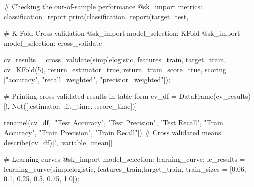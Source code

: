 \documentclass[
  letterpaper,
]{book}
\newenvironment{Shaded}{\begin{snugshade}}{\end{snugshade}}
\newcommand{\CommentTok}[1]{\textcolor[rgb]{0.37,0.37,0.37}{#1}}
\newcommand{\ConstantTok}[1]{\textcolor[rgb]{0.56,0.35,0.01}{#1}}
\newcommand{\FloatTok}[1]{\textcolor[rgb]{0.68,0.00,0.00}{#1}}
\newcommand{\FunctionTok}[1]{\textcolor[rgb]{0.28,0.35,0.67}{#1}}
\newcommand{\NormalTok}[1]{\textcolor[rgb]{0.00,0.23,0.31}{#1}}
\newcommand{\OperatorTok}[1]{\textcolor[rgb]{0.37,0.37,0.37}{#1}}
\newcommand{\PreprocessorTok}[1]{\textcolor[rgb]{0.68,0.00,0.00}{#1}}
\newcommand{\StringTok}[1]{\textcolor[rgb]{0.13,0.47,0.30}{#1}}
\begin{document}
\begin{Shaded}
\begin{Highlighting}[]
\CommentTok{\# Checking the out{-}of{-}sample performance}
\PreprocessorTok{@sk\_import}\NormalTok{ metrics}\OperatorTok{:}\NormalTok{ classification\_report}
\FunctionTok{print}\NormalTok{(}\FunctionTok{classification\_report}\NormalTok{(target\_test,}

\CommentTok{\# K{-}Fold Cross validation }
\PreprocessorTok{@sk\_import}\NormalTok{ model\_selection}\OperatorTok{:}\NormalTok{ KFold}
\PreprocessorTok{@sk\_import}\NormalTok{ model\_selection}\OperatorTok{:}\NormalTok{ cross\_validate}

\NormalTok{cv\_results }\OperatorTok{=} \FunctionTok{cross\_validate}\NormalTok{(simplelogistic, }
\NormalTok{        features\_train, target\_train, }
\NormalTok{            cv}\OperatorTok{=}\FunctionTok{KFold}\NormalTok{(}\FloatTok{5}\NormalTok{),}
\NormalTok{            return\_estimator}\OperatorTok{=}\ConstantTok{true}\NormalTok{,}
\NormalTok{            return\_train\_score}\OperatorTok{=}\ConstantTok{true}\NormalTok{, }
\NormalTok{            scoring}\OperatorTok{=}\NormalTok{[}\StringTok{"accuracy"}\NormalTok{,}
                 \StringTok{"recall\_weighted"}\NormalTok{, }\StringTok{"precision\_weighted"}\NormalTok{]);}

\CommentTok{\# Printing cross validated results in table form }
\NormalTok{cv\_df }\OperatorTok{=} \FunctionTok{DataFrame}\NormalTok{(cv\_results)[!, }
        \FunctionTok{Not}\NormalTok{([}\OperatorTok{:}\NormalTok{estimator, }\OperatorTok{:}\NormalTok{fit\_time, }\OperatorTok{:}\NormalTok{score\_time])]}

\FunctionTok{rename!}\NormalTok{(cv\_df, [}\StringTok{"Test Accuracy"}\NormalTok{,}
                \StringTok{"Test Precision"}\NormalTok{,}
                \StringTok{"Test Recall"}\NormalTok{,}
                \StringTok{"Train Accuracy"}\NormalTok{,}
                \StringTok{"Train Precision"}\NormalTok{,}
                \StringTok{"Train Recall"}\NormalTok{])}
\CommentTok{\# Cross validated means }
\FunctionTok{describe}\NormalTok{(cv\_df)[!,[}\OperatorTok{:}\NormalTok{variable, }\OperatorTok{:}\NormalTok{mean]]}

\CommentTok{\# Learning curves}
\PreprocessorTok{@sk\_import}\NormalTok{ model\_selection}\OperatorTok{:}\NormalTok{ learning\_curve;}
\NormalTok{lc\_results }\OperatorTok{=} \FunctionTok{learning\_curve}\NormalTok{(simplelogistic, }
\NormalTok{        features\_train,target\_train, }
\NormalTok{            train\_sizes }\OperatorTok{=}\NormalTok{ [}\FloatTok{0.06}\NormalTok{, }\FloatTok{0.1}\NormalTok{, }\FloatTok{0.25}\NormalTok{, }\FloatTok{0.5}\NormalTok{, }\FloatTok{0.75}\NormalTok{, }\FloatTok{1.0}\NormalTok{]);}


\end{Highlighting}
\end{Shaded}
\end{document}
